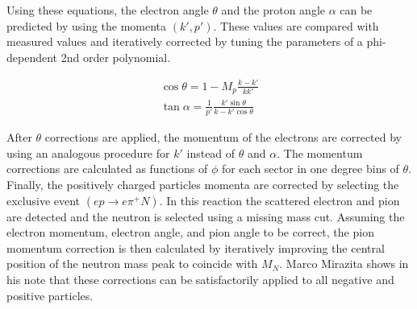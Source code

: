 Using these equations, the electron angle $\theta$ and the proton angle $\alpha$ can be predicted by using the momenta $(k',p')$.  These values are compared with measured values and iteratively corrected by tuning the parameters of a phi-dependent 2nd order polynomial.

\begin{gather}
	\cos\theta = 1 - M_p \frac{k-k'}{kk'} \\
	\tan\alpha = \frac{1}{p'} \frac{k'\sin\theta}{k-k'\cos\theta}
\end{gather}

After $\theta$ corrections are applied, the momentum of the electrons are corrected by using an analogous procedure for $k'$ instead of $\theta$ and $\alpha$.  The momentum corrections are calculated as functions of $\phi$ for each sector in one degree bins of $\theta$.  Finally, the positively charged particles momenta are corrected by selecting the exclusive event $(ep \rightarrow e\pi^+N)$.  In this reaction the scattered electron and pion are detected and the neutron is selected using a missing mass cut.  Assuming the electron momentum, electron angle, and pion angle to be correct, the pion momentum correction is then calculated by iteratively improving the central position of the neutron mass peak to coincide with $M_{N}$.  Marco Mirazita shows in his note that these corrections can be satisfactorily applied to all negative and positive particles.

